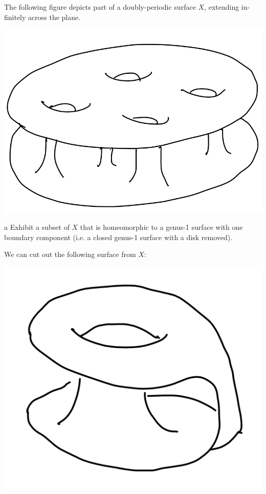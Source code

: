\documentclass{pset}
\begin{document}
\begin{problem}{2}
  The following figure depicts part of a doubly-periodic surface $X$, extending in-
  finitely across the plane.
\end{problem}

\begin{solution}
  \begin{center}
    \includegraphics[scale=0.5]{figure1.png}
  \end{center}
  \begin{part}{a}
    Exhibit a subset of $X$ that is homeomorphic to a genus-1 surface with one boundary component (i.e. a closed genus-1 surface with a disk removed).
  \end{part}

  We can cut out the following surface from $X$:
  \begin{center}
    \includegraphics[scale=0.5]{figure2.png}
  \end{center}


\end{solution}
\end{document}
